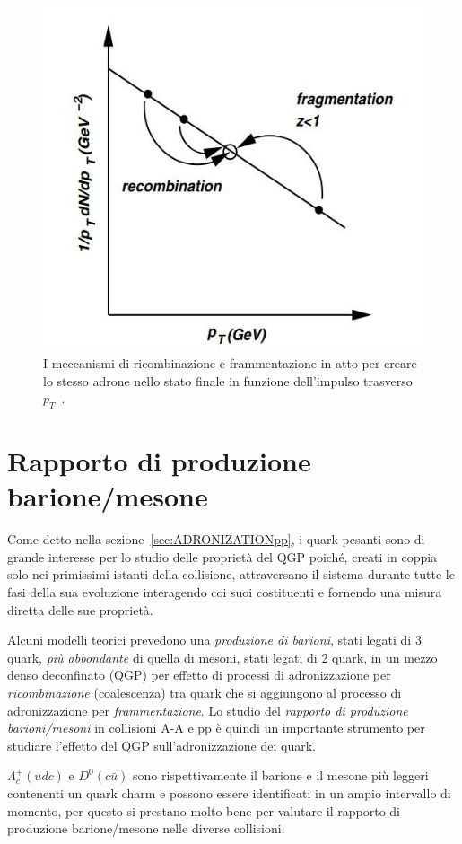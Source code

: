 \newpage

    \begin{figure}[h]
        \centering
        \includegraphics[width=0.6\linewidth]{res/fig/1-chapter/7-fragm-recom.jpg}
        \caption{I meccanismi di ricombinazione e frammentazione in atto per creare lo stesso adrone nello stato finale in funzione dell'impulso trasverso $p_{T}$~\cite{Vogt_2007}.}
        \label{fig:7-fragm-recom}
    \end{figure}

\newpage

\section{Rapporto di produzione barione/mesone}
\label{sec:BARIONE/MESONE}
    Come detto nella sezione~\ref{sec:ADRONIZATIONpp}, i quark pesanti sono di grande interesse per lo studio delle proprietà del QGP poiché, creati in coppia solo nei primissimi istanti della collisione, attraversano il sistema durante tutte le fasi della sua evoluzione interagendo coi suoi costituenti e fornendo una misura diretta delle sue proprietà.

    Alcuni modelli teorici prevedono una \textit{produzione di barioni}, stati legati di 3 quark, \textit{più abbondante} di quella di mesoni, stati legati di 2 quark, in un mezzo denso deconfinato (QGP) per effetto di processi di adronizzazione per \textit{ricombinazione} (coalescenza) tra quark che si aggiungono al processo di adronizzazione per \textit{frammentazione}. Lo studio del \textit{rapporto di produzione barioni/mesoni} in collisioni A-A e pp è quindi un importante strumento per studiare l'effetto del QGP sull'adronizzazione dei quark.

    $\Lambda_{c}^{+}(udc)$ e $D^{0}(c \bar{u})$ sono rispettivamente il barione e il mesone più leggeri contenenti un quark charm e possono essere identificati in un ampio intervallo di momento, per questo si prestano molto bene per valutare il rapporto di produzione barione/mesone nelle diverse collisioni.

